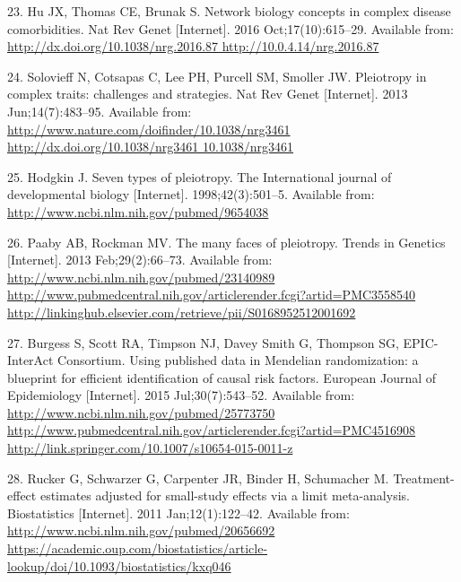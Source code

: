 \documentclass[]{article}
\begin{document}
\hypertarget{ref-Hu2016}{}
23. Hu JX, Thomas CE, Brunak S. Network biology concepts in complex
disease comorbidities. Nat Rev Genet {[}Internet{]}. 2016
Oct;17(10):615--29. Available from:
\href{http://dx.doi.org/10.1038/nrg.2016.87\%20http://10.0.4.14/nrg.2016.87}{http://dx.doi.org/10.1038/nrg.2016.87 http://10.0.4.14/nrg.2016.87}

\hypertarget{ref-Solovieff2013}{}
24. Solovieff N, Cotsapas C, Lee PH, Purcell SM, Smoller JW. Pleiotropy
in complex traits: challenges and strategies. Nat Rev Genet
{[}Internet{]}. 2013 Jun;14(7):483--95. Available from:
\href{http://www.nature.com/doifinder/10.1038/nrg3461\%20http://dx.doi.org/10.1038/nrg3461\%2010.1038/nrg3461}{http://www.nature.com/doifinder/10.1038/nrg3461 http://dx.doi.org/10.1038/nrg3461 10.1038/nrg3461}

\hypertarget{ref-Hodgkin1998}{}
25. Hodgkin J. Seven types of pleiotropy. The International journal of
developmental biology {[}Internet{]}. 1998;42(3):501--5. Available from:
\url{http://www.ncbi.nlm.nih.gov/pubmed/9654038}

\hypertarget{ref-Paaby2013}{}
26. Paaby AB, Rockman MV. The many faces of pleiotropy. Trends in
Genetics {[}Internet{]}. 2013 Feb;29(2):66--73. Available from:
\href{http://www.ncbi.nlm.nih.gov/pubmed/23140989\%20http://www.pubmedcentral.nih.gov/articlerender.fcgi?artid=PMC3558540\%20http://linkinghub.elsevier.com/retrieve/pii/S0168952512001692}{http://www.ncbi.nlm.nih.gov/pubmed/23140989 http://www.pubmedcentral.nih.gov/articlerender.fcgi?artid=PMC3558540 http://linkinghub.elsevier.com/retrieve/pii/S0168952512001692}

\hypertarget{ref-Burgess2015b}{}
27. Burgess S, Scott RA, Timpson NJ, Davey Smith G, Thompson SG, EPIC-
InterAct Consortium. Using published data in Mendelian randomization: a
blueprint for efficient identification of causal risk factors. European
Journal of Epidemiology {[}Internet{]}. 2015 Jul;30(7):543--52.
Available from:
\href{http://www.ncbi.nlm.nih.gov/pubmed/25773750\%20http://www.pubmedcentral.nih.gov/articlerender.fcgi?artid=PMC4516908\%20http://link.springer.com/10.1007/s10654-015-0011-z}{http://www.ncbi.nlm.nih.gov/pubmed/25773750 http://www.pubmedcentral.nih.gov/articlerender.fcgi?artid=PMC4516908 http://link.springer.com/10.1007/s10654-015-0011-z}

\hypertarget{ref-Rucker2011}{}
28. Rucker G, Schwarzer G, Carpenter JR, Binder H, Schumacher M.
Treatment-effect estimates adjusted for small-study effects via a limit
meta-analysis. Biostatistics {[}Internet{]}. 2011 Jan;12(1):122--42.
Available from:
\href{http://www.ncbi.nlm.nih.gov/pubmed/20656692\%20https://academic.oup.com/biostatistics/article-lookup/doi/10.1093/biostatistics/kxq046}{http://www.ncbi.nlm.nih.gov/pubmed/20656692 https://academic.oup.com/biostatistics/article-lookup/doi/10.1093/biostatistics/kxq046}
\end{document}
